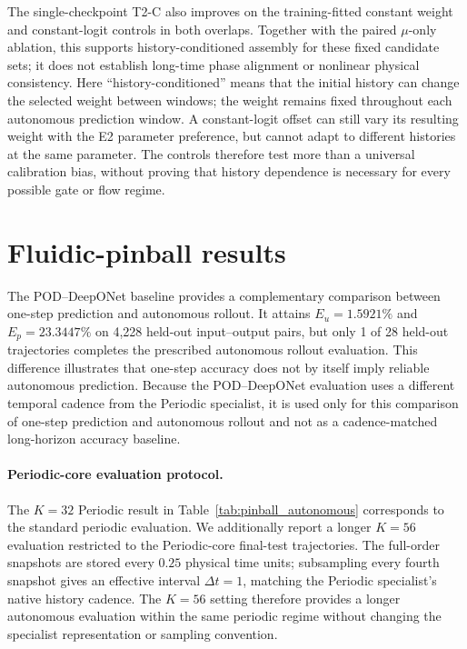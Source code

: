 \documentclass{article}
\providecommand{\DIFaddtex}[1]{{\protect\color{blue} \sf #1}} %
\providecommand{\DIFaddbegin}{} %
\providecommand{\DIFaddend}{} %
\providecommand{\DIFadd}[1]{\texorpdfstring{\DIFaddtex{#1}}{#1}} %
\begin{document}
The single-checkpoint T2-C also improves on the training-fitted constant
weight and constant-logit controls in both overlaps. Together with the
paired $\mu$-only ablation, this supports history-conditioned assembly
for these fixed candidate sets; it does not establish long-time phase
alignment or nonlinear physical consistency.
\DIFaddbegin \DIFadd{Here ``history-conditioned'' means that the initial history can change
the selected weight between windows; the weight remains fixed throughout
each autonomous prediction window. A constant-logit offset can still
vary its resulting weight with the E2 parameter preference, but cannot
adapt to different histories at the same parameter. The controls therefore
test more than a universal calibration bias, without proving that history
dependence is necessary for every possible gate or flow regime.
}\DIFaddend 

\FloatBarrier
\section{Fluidic-pinball results}
\label{app:pinball}

The POD--DeepONet baseline provides a complementary comparison between
one-step prediction and autonomous rollout. It attains $E_u=1.5921\%$ and $E_p=23.3447\%$ on 4,228 held-out input--output pairs, but only 1 of 28 held-out trajectories completes the prescribed autonomous rollout evaluation. This difference illustrates that one-step accuracy does not by itself imply reliable autonomous prediction. Because the POD--DeepONet evaluation uses a different temporal cadence from
the Periodic specialist, it is used only for this comparison of one-step prediction and autonomous rollout and not as a cadence-matched long-horizon accuracy baseline.

\paragraph{Periodic-core evaluation protocol.}
The $K=32$ Periodic result in Table~\ref{tab:pinball_autonomous} corresponds to the standard periodic evaluation. We additionally report a longer $K=56$ evaluation restricted to the Periodic-core final-test trajectories. The full-order snapshots are stored every $0.25$ physical time units; subsampling every fourth snapshot gives an effective interval $\Delta t=1$, matching the Periodic specialist's native history cadence. The $K=56$ setting therefore provides a longer autonomous evaluation within the same periodic regime without changing the specialist representation or
sampling convention.
\end{document}
